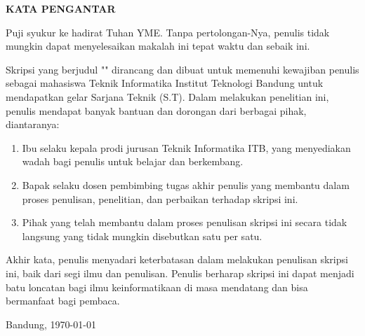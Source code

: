\clearpage

\begin{center}
 \textbf{\large KATA PENGANTAR}\\[3em]
\end{center}

Puji syukur ke hadirat Tuhan YME. Tanpa pertolongan-Nya, penulis tidak mungkin dapat menyelesaikan makalah ini tepat waktu dan sebaik ini.

Skripsi yang berjudul "\textit{\thetitle}" dirancang dan dibuat untuk memenuhi kewajiban penulis sebagai mahasiswa Teknik Informatika Institut Teknologi Bandung untuk mendapatkan gelar Sarjana Teknik (S.T).
Dalam melakukan penelitian ini, penulis mendapat banyak bantuan dan dorongan dari berbagai pihak, diantaranya:
\begin{enumerate}
  \item Ibu \dean{} selaku kepala prodi jurusan Teknik Informatika ITB, yang menyediakan wadah bagi penulis untuk belajar dan berkembang.
  \item Bapak \supervisor{} selaku dosen pembimbing tugas akhir penulis yang membantu dalam proses penulisan, penelitian, dan perbaikan terhadap skripsi ini.
  \item Pihak yang telah membantu dalam proses penulisan skripsi ini secara tidak langsung yang tidak mungkin disebutkan satu per satu. 
\end{enumerate}

Akhir kata, penulis menyadari keterbatasan dalam melakukan penulisan skripsi ini, baik dari segi ilmu dan penulisan.
Penulis berharap skripsi ini dapat menjadi batu loncatan bagi ilmu keinformatikaan di masa mendatang dan bisa bermanfaat bagi pembaca.

Bandung, \today

\theauthor


